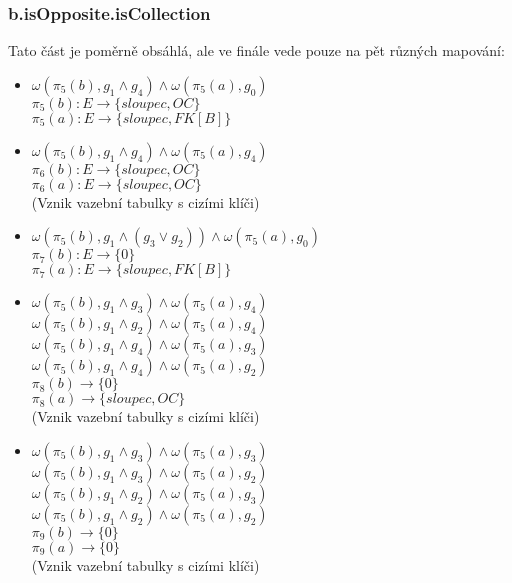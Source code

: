 \documentclass[11pt,a4paper]{article}
\begin{document}
   		\subsubsection{b.isOpposite.isCollection}
   		Tato část je poměrně obsáhlá, ale ve finále vede pouze na pět různých mapování:
   				\begin{itemize}				    
         			\item			$\omega(\pi_5(b),g_1 \wedge g_4) \wedge \omega(\pi_5(a), g_0)$\\        							
         							$\pi_5(b) : E \to \{ sloupec, OC\}$ \\
         							$\pi_5(a) : E \to \{ sloupec, FK[B]\}$		
         			\item			$\omega(\pi_5(b),g_1 \wedge g_4) \wedge \omega(\pi_5(a), g_4)$\\    							
         							$\pi_6(b) : E \to \{ sloupec, OC\}$ \\
         							$\pi_6(a) : E \to \{ sloupec, OC\}$	\\	
         							(Vznik vazební tabulky s cizími klíči)
         			\item			$\omega(\pi_5(b),g_1 \wedge (g_3 \vee g_2)) \wedge \omega(\pi_5(a), g_0)$\\   							
         							$\pi_7(b) : E \to \{ 0\}$ \\
         							$\pi_7(a) : E \to \{ sloupec, FK[B]\}$	\\
         			\item			$\omega(\pi_5(b),g_1 \wedge g_3) \wedge \omega(\pi_5(a), g_4)$\\
         							$\omega(\pi_5(b),g_1 \wedge g_2) \wedge \omega(\pi_5(a), g_4)$\\
         							$\omega(\pi_5(b),g_1 \wedge g_4) \wedge \omega(\pi_5(a), g_3)$\\
         							$\omega(\pi_5(b),g_1 \wedge g_4) \wedge \omega(\pi_5(a), g_2)$\\             							
         							$\pi_8(b) \to \{ 0\}$ \\
         							$\pi_8(a) \to \{ sloupec, OC\}$	\\	
         							(Vznik vazební tabulky s cizími klíči)	 
         		     \item 			$\omega(\pi_5(b),g_1 \wedge g_3) \wedge \omega(\pi_5(a), g_3)$\\
         							$\omega(\pi_5(b),g_1 \wedge g_3) \wedge \omega(\pi_5(a), g_2)$\\
         							$\omega(\pi_5(b),g_1 \wedge g_2) \wedge \omega(\pi_5(a), g_3)$\\
         							$\omega(\pi_5(b),g_1 \wedge g_2) \wedge \omega(\pi_5(a), g_2)$\\       							
         							$\pi_9(b) \to \{ 0\}$ \\
         							$\pi_9(a) \to \{ 0\}$	\\	
         							(Vznik vazební tabulky s cizími klíči)	 				   							
   				\end{itemize}			   		    
\end{document}
